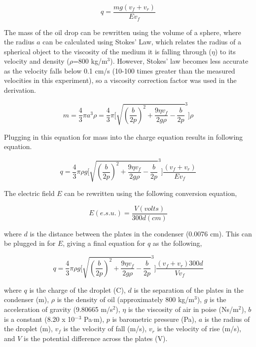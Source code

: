 \documentclass[11pt, oneside]{article}   	%
\begin{document}
\begin{equation}
q=\frac{mg(v_{f}+v_{r})}{Ev_{f}}
\end{equation}

The mass of the oil drop can be rewritten using the volume of a sphere, where the radius $a$ can be calculated using Stokes' Law, which relates the radius of a spherical object to the viscosity of the medium it is falling through ($\eta$) to its velocity and density ($\rho$=800 kg/m$^3$). However, Stokes' law becomes less accurate as the velocity falls below 0.1 cm/s (10-100 times greater than the measured velocities in this experiment), so a viscosity correction factor was used in the derivation.

\begin{equation}
m=\frac{4}{3}\pi a^3\rho=\frac{4}{3}\pi\Bigg[\sqrt{(\frac{b}{2p})^2+\frac{9\eta v_{f}}{2g\rho}-\frac{b}{2p}}^3\Bigg]\rho
\end{equation}

\noindent Plugging in this equation for mass into the charge equation results in following equation.

\begin{equation}
q=\frac{4}{3}\pi\rho g\Bigg[\sqrt{(\frac{b}{2p})^2+\frac{9\eta v_{f}}{2g\rho}-\frac{b}{2p}}^3\Bigg]\frac{(v_{f}+v_{r})}{Ev_{f}}
\end{equation}

\noindent The electric field $E$ can be rewritten using the following conversion equation,

\begin{equation}
E(e.s.u.)=\frac{V(volts)}{300d(cm)}
\end{equation}

\noindent where $d$ is the distance between the plates in the condenser (0.0076 cm). This can be plugged in for $E$, giving a final equation for $q$ as the following,

\begin{equation}
q=\frac{4}{3}\pi\rho g\Bigg[\sqrt{(\frac{b}{2p})^2+\frac{9\eta v_{f}}{2g\rho}-\frac{b}{2p}}^3\Bigg]\frac{(v_{f}+v_{r})300d}{Vv_{f}}
\end{equation}

\noindent where $q$ is the charge of the droplet (C), $d$ is the separation of the plates in the condenser (m), $\rho$ is the density of oil (approximately 800 kg/m$^3$), $g$ is the acceleration of gravity (9.80665 m/s$^2$), $\eta$ is the viscosity of air in poise (Ns/m$^2$), $b$ is a constant (8.20 x 10$^-$$^3$ Pa$\cdot$m), $p$ is barometric pressure (Pa), $a$ is the radius of the droplet (m), $v_{f}$ is the velocity of fall (m/s), $v_{r}$ is the velocity of rise (m/s), and $V$ is the potential difference across the plates (V).
\end{document}
